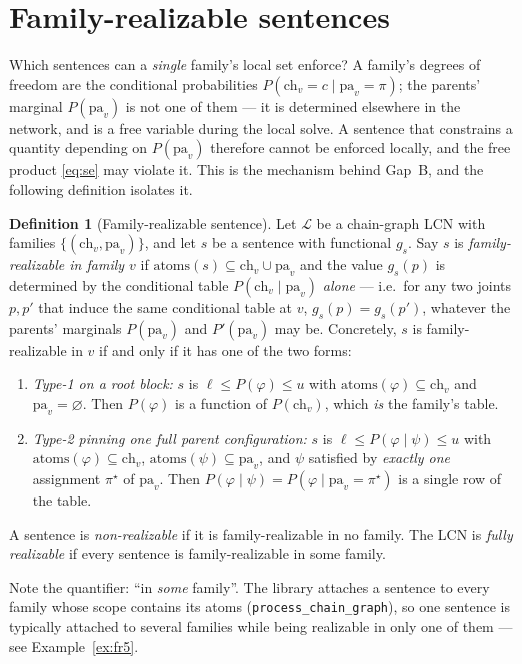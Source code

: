 \documentclass[11pt]{article}
\theoremstyle{definition}
\newtheorem{definition}{Definition}
\newcommand{\ch}{\mathrm{ch}}
\newcommand{\pa}{\mathrm{pa}}
\newcommand{\atoms}{\mathrm{atoms}}
\begin{document}
\section{Family-realizable sentences}\label{sec:realizable}

Which sentences can a \emph{single} family's local set enforce? A family's degrees of freedom are the
conditional probabilities $P(\ch_v{=}c\mid\pa_v{=}\pi)$; the parents' marginal $P(\pa_v)$ is not one
of them --- it is determined elsewhere in the network, and is a free variable during the local solve.
A sentence that constrains a quantity depending on $P(\pa_v)$ therefore cannot be enforced locally,
and the free product \eqref{eq:se} may violate it. This is the mechanism behind Gap~B, and the
following definition isolates it.

\begin{definition}[Family-realizable sentence]\label{def:realizable}
Let $\mathcal L$ be a chain-graph LCN with families $\{(\ch_v,\pa_v)\}$, and let $s$ be a sentence
with functional $g_s$. Say $s$ is \emph{family-realizable in family $v$} if $\atoms(s)\subseteq
\ch_v\cup\pa_v$ and the value $g_s(p)$ is determined by the conditional table
$P(\ch_v\mid\pa_v)$ \emph{alone} --- i.e.\ for any two joints $p,p'$ that induce the same conditional
table at $v$, $g_s(p)=g_s(p')$, whatever the parents' marginals $P(\pa_v)$ and $P'(\pa_v)$ may be.
Concretely, $s$ is family-realizable in $v$ if and only if it has one of the two forms:
\begin{enumerate}
  \item[\textup{(R1)}] \emph{Type-1 on a root block:} $s$ is $\ell\le P(\varphi)\le u$ with
    $\atoms(\varphi)\subseteq\ch_v$ and $\pa_v=\varnothing$. Then $P(\varphi)$ is a function of
    $P(\ch_v)$, which \emph{is} the family's table.
  \item[\textup{(R2)}] \emph{Type-2 pinning one full parent configuration:} $s$ is
    $\ell\le P(\varphi\mid\psi)\le u$ with $\atoms(\varphi)\subseteq\ch_v$,
    $\atoms(\psi)\subseteq\pa_v$, and $\psi$ satisfied by \emph{exactly one} assignment $\pi^\star$
    of $\pa_v$. Then $P(\varphi\mid\psi)=P(\varphi\mid\pa_v{=}\pi^\star)$ is a single row of the
    table.
\end{enumerate}
A sentence is \emph{non-realizable} if it is family-realizable in no family. The LCN is \emph{fully
realizable} if every sentence is family-realizable in some family.
\end{definition}

Note the quantifier: ``in \emph{some} family''. The library attaches a sentence to every family whose
scope contains its atoms (\texttt{process\_chain\_graph}), so one sentence is typically attached to
several families while being realizable in only one of them --- see Example~\ref{ex:fr5}.
\end{document}
